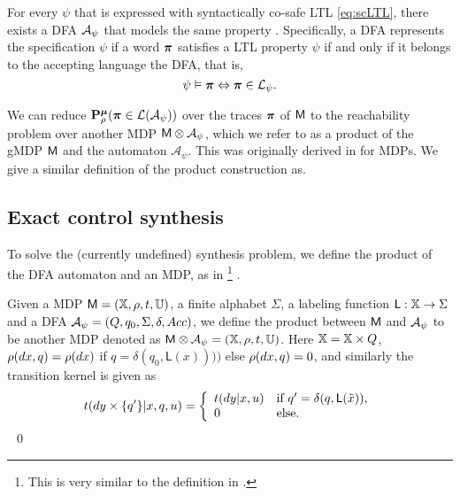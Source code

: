 \documentclass{ifacconf}
\newcommand{\red}[1]{{\color{red} #1}}
\begin{document}
For every $\psi$ that is expressed with syntactically co-safe LTL  \eqref{eq:scLTL}, there exists a DFA  $\mathcal{A}_\psi$ that models the same property \citep{Belta2017}. Specifically, a DFA represents the specification $\psi$ if a word ${\boldsymbol{\pi}}$ satisfies a LTL property $\psi$ if and only if it belongs to the accepting language the DFA, that is,
	 \[\psi\vDash{\boldsymbol{\pi}} \Leftrightarrow {\boldsymbol{\pi}}\in \mathcal{L}_\psi.\]

We can
reduce $\mathbf{P}_\rho^{\boldsymbol{\mu}}
({\boldsymbol{\pi}} \in\mathcal L(\mathcal A_\psi))$  over the traces ${\boldsymbol{\pi}}$ of $\mathsf{M}$ to the reachability problem
 over another MDP   $\mathsf{M}\otimes\mathcal A_\psi$, which we refer to as a product of the gMDP $\mathsf{M}$ and the automaton $\mathcal A_\psi$. This was originally derived in \cite{tmka2013} for MDPs. We give a similar definition of the product construction as.

\subsection{Exact control synthesis}


To solve the \red{(currently undefined)} synthesis problem, we define the product of the DFA automaton and an MDP, 
as in \cite{tech_report_TACAS}\footnote{\red{This is very similar to the definition in \cite{tmka2013}. }} .
\begin{definition}
\label{def:product}
Given a MDP  $\mathsf{M} = ({\mathbb{X}}, \rho, t, {\mathbb{U}})$,
a finite alphabet $\Sigma$,
a labeling function $\mathsf{L}:{\mathbb{X}}\rightarrow\Sigma$
and a DFA  $\mathcal{A}_\psi = (Q, q_0, \Sigma, \delta, Acc)$,
we define the product between $\mathsf{M}$ and $\mathcal{A}_\psi$ to be another MDP denoted as
$\mathsf{M}\otimes\mathcal{A}_\psi = (\relax {\mathbb{X}}, \relax\rho,\relax{t},{\mathbb{U}})$.
Here $\relax {\mathbb{X}}= {\mathbb{X}}\times Q$, $\relax\rho(dx,q) = \rho(dx)$ if $q= \delta(q_0,\mathsf L(x))))$ else $ \relax\rho(dx,q) =0$, and similarly the transition kernel is given as
\begin{equation*}
  \relax{t}(d y\times\{q'\}|x,q,u) =  \left\{\begin{array}{ll}t(dy|x,u)& \text{if } q' =\delta(q,\mathsf{L}(\tilde x)),\\ 0 & \text{else.}  \end{array}\right.
\end{equation*} 
\hfill \mbox{ }\qed
\end{definition}
\end{document}
